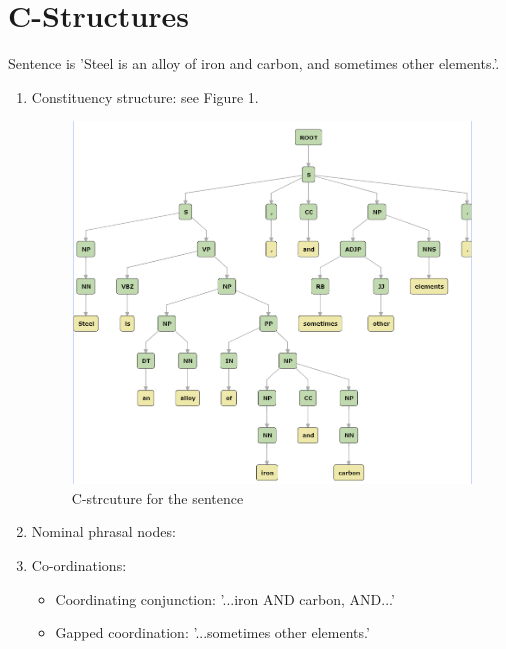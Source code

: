 \documentclass{article}
\begin{document}
\section{C-Structures}
Sentence is 'Steel is an alloy of iron and carbon, and sometimes other
elements.'.
\begin{enumerate}
  \item Constituency structure: see Figure 1.
  \begin{figure}
    \includegraphics[width=\linewidth]{task2img.PNG}
    \caption{C-strcuture for the sentence}
    \label{Cstruct}
  \end{figure}
  \item Nominal phrasal nodes:
  \item Co-ordinations:
  \begin{itemize}
    \item Coordinating conjunction: '...iron AND carbon, AND...'
    \item Gapped coordination: '...sometimes other elements.'
  \end{itemize}
\end{enumerate}
\end{document}
